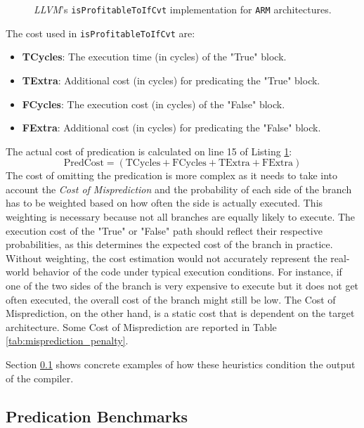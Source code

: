 \begin{figure}[H]
    \centering
    
    \caption{\textit{LLVM}'s \texttt{isProfitableToIfCvt} implementation for \texttt{ARM} architectures.}
    \label{lst:predications_heuristic}
\end{figure}

The cost used in \texttt{isProfitableToIfCvt} are:

\begin{itemize}
    \item \textbf{TCycles}: The execution time (in cycles) of the "True" block.
    \item \textbf{TExtra}: Additional cost (in cycles) for predicating the "True" block.
    \item \textbf{FCycles}: The execution cost (in cycles) of the "False" block.
    \item \textbf{FExtra}: Additional cost (in cycles) for predicating the "False" block.
\end{itemize}

The actual cost of predication is calculated on line 15 of Listing \ref{lst:predications_heuristic}:
\[
\text{PredCost} = (\text{TCycles} + \text{FCycles} + \text{TExtra} + \text{FExtra})
\]
The cost of omitting the predication is more complex as it needs to take into account the \textit{Cost of Misprediction} and the probability of each side of the branch has to be weighted based on how often the side is actually executed.
This weighting is necessary because not all branches are equally likely to execute. The execution cost of the "True" or "False" path should reflect their respective probabilities, as this determines the expected cost of the branch in practice. Without weighting, the cost estimation would not accurately represent the real-world behavior of the code under typical execution conditions. For instance, if one of the two sides of the branch is very expensive to execute but it does not get often executed, the overall cost of the branch might still be low.
The {Cost of Misprediction}, on the other hand, is a static cost that is dependent on the target architecture. Some {Cost of Misprediction} are reported in Table \ref{tab:misprediction_penalty}.

Section \ref{sec:predication_benchmark} shows concrete examples of how these heuristics condition the output of the compiler.

\subsection{Predication Benchmarks}
\label{sec:predication_benchmark}

